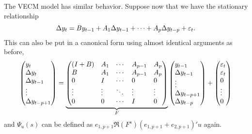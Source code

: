 \documentclass[12pt,fleqn]{article}
\begin{document}
The VECM model has similar behavior. Suppose now that we have the
stationary relationship
\begin{equation*}
  \Delta y_t = B y_{t-1} + A_1 \Delta y_{t-1} + \cdots + A_p \Delta
  y_{t-p} + \varepsilon_t.
\end{equation*}
This can also be put in a canonical form using almost identical
arguments as before,
\begin{equation*}
  \begin{pmatrix*}[l]
    y_t \\ \Delta y_t \\ \Delta y_{t-1} \\ \vdots \\ \Delta y_{t-p+1}
  \end{pmatrix*}
  =
  \underbrace{\begin{pmatrix*}[l]
    (I + B) & A_1    & \cdots & A_{p-1} & A_p    \\
    B       & A_1    & \cdots & A_{p-1} & A_p    \\
    0       & I      & \cdots & 0       & 0      \\
    \vdots  & \vdots & \ddots & \vdots  & \vdots \\
    0       & 0      & \cdots & I       & 0
  \end{pmatrix*}}_F
  \begin{pmatrix*}[l]
    y_{t-1} \\ \Delta y_{t-1} \\ \vdots \\ \Delta y_{t-p+1} \\ \Delta y_{t-p}
  \end{pmatrix*}
  +
  \begin{pmatrix*}[l]
    \vep_t \\ \vep_t \\ 0 \\ \vdots \\ 0
  \end{pmatrix*}
\end{equation*}
and $\Psi_u(s)$ can be defined as
$e_{1,p+1} \Re(F^s) (e_{1,p+1} + e_{2,p+1})' u$ again.
\end{document}
